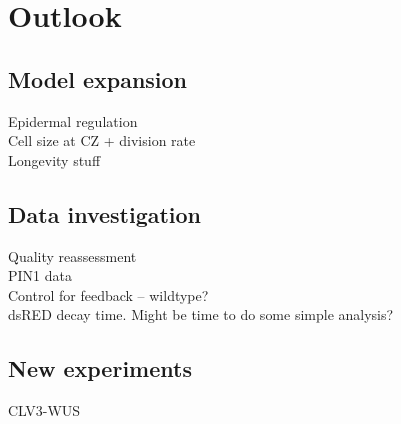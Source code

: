 \chapter{Outlook}

\ifpdf
\graphicspath{{Chapter5/Figs/Raster/}{Chapter5/Figs/PDF/}{Chapter5/Figs/}}
\else
\graphicspath{{Chapter5/Figs/Vector/}{Chapter5/Figs/}}
\fi

\section{Model expansion}
Epidermal regulation \\
Cell size at CZ + division rate \\
Longevity stuff

\section{Data investigation}
Quality reassessment \\
PIN1 data \\
Control for feedback -- wildtype? \\
dsRED decay time. Might be time to do some simple analysis?

\section{New experiments}
CLV3-WUS
